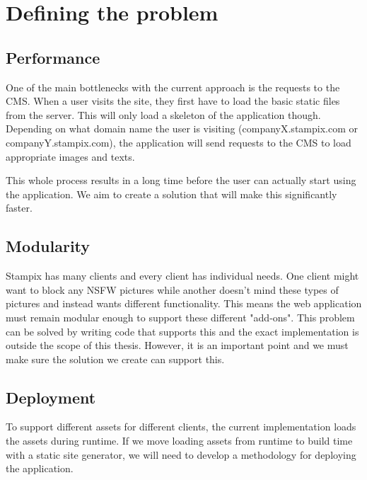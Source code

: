 
\chapter{Defining the problem} %

\label{Chapter2} 


\section{Performance}

One of the main bottlenecks with the current approach is the requests to the CMS. When a user visits the site, they first have to load the basic static files from the server. 
This will only load a skeleton of the application though. Depending on what domain name the user is visiting (companyX.stampix.com or companyY.stampix.com), the application will send requests to the CMS to load appropriate images and texts.

This whole process results in a long time before the user can actually start using the application. We aim to create a solution that will make this significantly faster.

\section{Modularity}

Stampix has many clients and every client has individual needs. One client might want to block any NSFW pictures while another doesn't mind these types of pictures and instead wants different functionality.
This means the web application must remain modular enough to support these different "add-ons". This problem can be solved by writing code that supports this and the exact implementation is outside the scope of this thesis. 
However, it is an important point and we must make sure the solution we create can support this.

\section{Deployment}

To support different assets for different clients, the current implementation loads the assets during runtime. 
If we move loading assets from runtime to build time with a static site generator, we will need to develop a methodology for deploying the application.